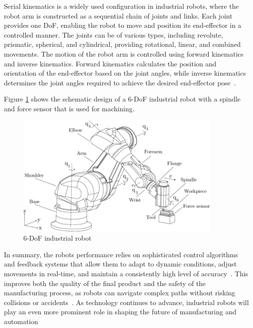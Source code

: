 Serial kinematics is a widely used configuration in industrial robots, where the robot arm is constructed as a sequential chain of joints and links. Each joint provides one DoF, enabling the robot to move and position its end-effector in a controlled manner. The joints can be of various types, including revolute, prismatic, spherical, and cylindrical, providing rotational, linear, and combined movements. The motion of the robot arm is controlled using forward kinematics and inverse kinematics. Forward kinematics calculates the position and orientation of the end-effector based on the joint angles, while inverse kinematics determines the joint angles required to achieve the desired end-effector pose~\cite{Singh.2021b}. %

Figure \ref{robot} shows the schematic design of a 6-DoF industrial robot with a spindle and force sensor that is used for machining.

\begin{figure}[H]
	\centerline{\includegraphics[width=0.9\textwidth]{figures/robot.png}}
	\caption{6-DoF industrial robot~\cite{HuynhHoaiNam.2018}}
	\label{robot}
\end{figure}
\newpage
In summary, the robots performance relies on sophisticated control algorithms and feedback systems that allow them to adapt to dynamic conditions, adjust movements in real-time, and maintain a consistently high level of accuracy~\cite{Lin.2023}. This improves both the quality of the final product and the safety of the manufacturing process, as robots can navigate complex paths without risking collisions or accidents~\cite{Bosscher.2011}.
As technology continues to advance, industrial robots will play an even more prominent role in shaping the future of manufacturing and automation~\cite{Domae.2019}


